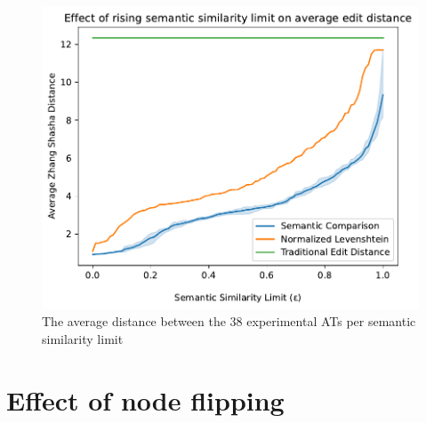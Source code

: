 \begin{figure}
\includegraphics[width=\linewidth]{code/img/similaritylimits2.pdf}
\caption{The average distance between the 38 experimental ATs per semantic similarity limit}
\label{img:similaritylimits}
\end{figure}



\section{Effect of node flipping}


